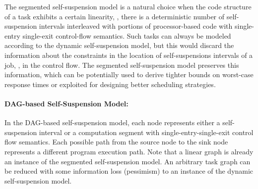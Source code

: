The segmented self-suspension model is a natural choice when the code structure of a task exhibits a certain linearity,
\ie, there is a deterministic number of self-suspension intervals interleaved with portions of processor-based code with single-entry
single-exit control-flow semantics. Such tasks can always be modeled according to the dynamic self-suspension
model, but this would discard the information about the constraints in the location of self-suspensions intervals of a job, \ie, in the control flow. The segmented self-suspension model preserves this information, which can be potentially used
to derive tighter bounds on worst-case response times or exploited for designing better scheduling strategies.

\paragraph{DAG-based Self-Suspension Model:} 


In the {DAG-based} self-suspension model\cite{bletsas:thesis}, each node represents either a self-suspension interval or a computation segment
with single-entry-single-exit control flow semantics. Each possible path from the source node to the sink node
represents a different program execution path. Note that a linear graph is already an instance of the segmented self-suspension model.
An arbitrary task graph can be reduced with some information loss (pessimism) to an instance of the dynamic self-suspension model. 







